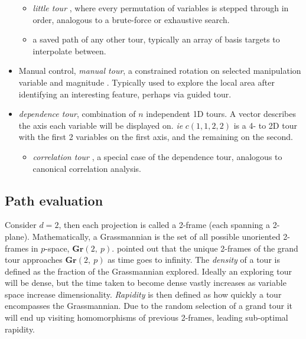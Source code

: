 \documentclass{monashthesis}
\begin{document}
\begin{itemize}
  \begin{itemize}
  \tightlist
  \item
    \emph{little tour} \autocite{mcdonald_interactive_1982}, where every
    permutation of variables is stepped through in order, analogous to a
    brute-force or exhaustive search.
  \item
    a saved path of any other tour, typically an array of basis targets
    to interpolate between.
  \end{itemize}
\item
  Manual control, \emph{manual tour}, a constrained rotation on selected
  manipulation variable and magnitude \autocite{cook_manual_1997}.
  Typically used to explore the local area after identifying an
  interesting feature, perhaps via guided tour.
\item
  \emph{dependence tour}, combination of \(n\) independent 1D tours. A
  vector describes the axis each variable will be displayed on.
  \emph{ie} \(c(1, 1, 2, 2)\) is a 4- to 2D tour with the first 2
  variables on the first axis, and the remaining on the second.

  \begin{itemize}
  \tightlist
  \item
    \emph{correlation tour} \autocite{buja_data_1987}, a special case of
    the dependence tour, analogous to canonical correlation analysis.
  \end{itemize}
\end{itemize}

\subsection{Path evaluation}\label{path-evaluation}

Consider \(d=2\), then each projection is called a 2-frame (each
spanning a 2-plane). Mathematically, a Grassmannian is the set of all
possible unoriented 2-frames in \(p\)-space, \(\textbf{Gr}(2,~p)\).
\textcite{asimov_grand_1985} pointed out that the unique 2-frames of the
grand tour approaches \(\textbf{Gr}(2,~p)\) as time goes to infinity.
The \emph{density} of a tour is defined as the fraction of the
Grassmannian explored. Ideally an exploring tour will be dense, but the
time taken to become dense vastly increases as variable space increase
dimensionality. \emph{Rapidity} is then defined as how quickly a tour
encompasses the Grassmannian. Due to the random selection of a grand
tour it will end up visiting homomorphisms of previous 2-frames, leading
sub-optimal rapidity.
\end{document}
